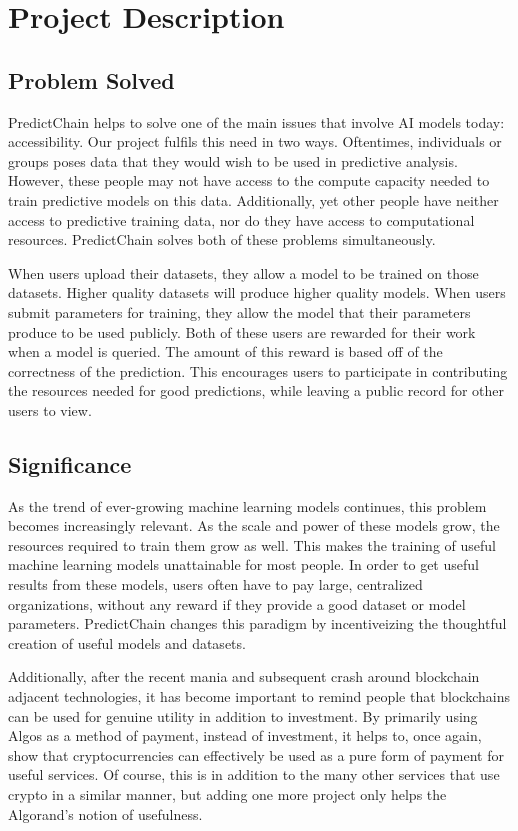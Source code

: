 \documentclass{ledger}
\begin{document}
\pagebreak

\section{Project Description}

\subsection{Problem Solved}

PredictChain helps to solve one of the main issues that involve AI models today: accessibility.  Our project fulfils this
need in two ways.  Oftentimes, individuals or groups poses data that they would wish to be used in predictive analysis.
However, these people may not have access to the compute capacity needed to train predictive models on this data.  Additionally,
yet other people have neither access to predictive training data, nor do they have access to computational resources.
PredictChain solves both of these problems simultaneously.

When users upload their datasets, they allow a model to be trained on those datasets.  Higher quality datasets will produce
higher quality models.  When users submit parameters for training, they allow the model that their parameters produce to
be used publicly.  Both of these users are rewarded for their work when a model is queried.  The amount of this reward
is based off of the correctness of the prediction.  This encourages users to participate in contributing the
resources needed for good predictions, while leaving a public record for other users to view.

\subsection{Significance}


As the trend of ever-growing machine learning models continues, this problem becomes increasingly relevant.
As the scale and power of these models grow, the resources required to train them grow as well.  This makes the training
of useful machine learning models unattainable for most people.  In order to get useful results from these models,
users often have to pay large, centralized organizations, without any reward if they provide a good dataset or model
parameters.  PredictChain changes this paradigm by incentiveizing the thoughtful creation of useful models and
datasets.

Additionally, after the recent mania and subsequent crash around blockchain adjacent technologies, it has become
important to remind people that blockchains can be used for genuine utility in addition to investment.  By primarily
using Algos as a method of payment, instead of investment, it helps to, once again, show that cryptocurrencies can
effectively be used as a pure form of payment for useful services.  Of course, this is in addition to the many other
services that use crypto in a similar manner, but adding one more project only helps the Algorand's notion of usefulness.
\end{document}
